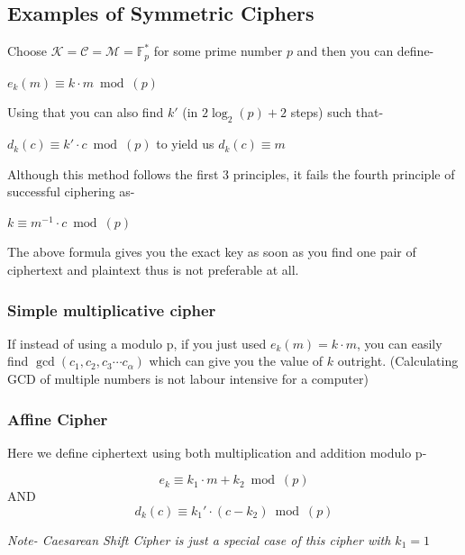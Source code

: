 		\subsection{Examples of Symmetric Ciphers}
			Choose \(\mathcal{K}=\mathcal{C}=\mathcal{M}=\mathbb{F}_p^*\) for some prime number \(p\) and then you can define- \par
			\centering \(e_k(m)\equiv k \cdot m \bmod(p)\) \par
			\raggedright Using that you can also find \(k'\) (in \(2\log_2(p)+ 2\) steps) such that- \par
			\centering \(d_k(c)\equiv k' \cdot c \bmod(p)\) to yield us \(d_k(c) \equiv m\) \par
			\raggedright Although this method follows the first 3 principles, it fails the fourth principle of successful ciphering as- \par
			\centering \(k \equiv m^{-1} \cdot c \bmod(p)\) \par 
			\raggedright The above formula gives you the exact key as soon as you find one pair of ciphertext and plaintext thus is not preferable at all.

			\subsubsection*{Simple multiplicative cipher}
				If instead of using a modulo p, if you just used \(e_k(m)= k \cdot m\), you can easily find \(\gcd(c_1, c_2, c_3 \cdots c_\alpha)\) which can give you the value of \(k\) outright. (Calculating GCD of multiple numbers is not labour intensive for a computer)

			\subsubsection*{Affine Cipher}
				Here we define ciphertext using both multiplication and addition modulo p- \par
				\[e_k \equiv k_1 \cdot m + k_2 \bmod(p)\] AND \[d_k(c) \equiv k_1' \cdot (c-k_2) \bmod(p)\] \par	
				\raggedright \emph{Note- Caesarean Shift Cipher is just a special case of this cipher with \(k_1 = 1\)} \par 

